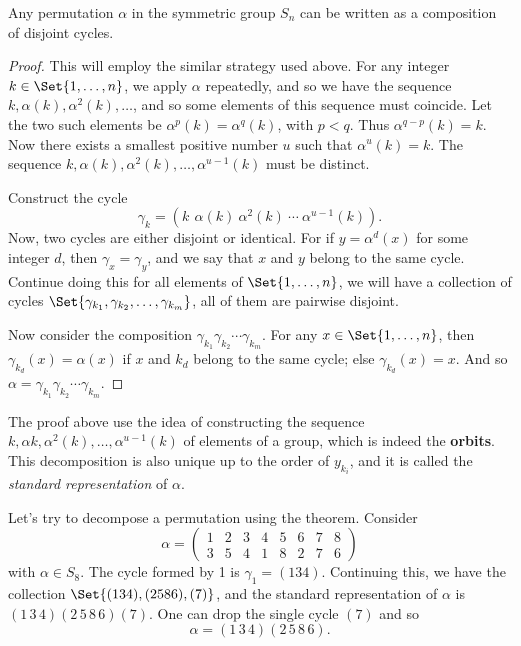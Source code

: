 \documentclass[main.tex]{subfiles}
\begin{document}
				\begin{theorem}
					Any permutation $\alpha$ in the symmetric group $S_n$ can be written as a composition of disjoint cycles.
				\end{theorem}
				\begin{proof}
					This will employ the similar strategy used above. For any integer $k \in \Set{1, \ldots, n}$, we apply $\alpha$ repeatedly, and so we have the sequence $k, \alpha (k), \alpha^2 (k), \ldots$, and so some elements of this sequence must coincide. Let the two such elements be $\alpha^p(k) = \alpha^q (k)$, with $p < q$. Thus $\alpha^{q - p}(k) = k$. Now there exists a smallest positive number $u$ such that $\alpha^u (k) = k$. The sequence  $k, \alpha (k), \alpha^2 (k), \ldots, \alpha^{u-1}(k)$ must be distinct. 
					
					Construct the cycle 
					\begin{equation*}
					\gamma_k = (k \:\, \alpha (k) \: \alpha^2 (k) \: \cdots \: \alpha^{u-1}(k)).
					\end{equation*} 
					Now, two cycles are either disjoint or identical. For if $y = \alpha^{d} (x)$ for some integer $d$, then $\gamma_x = \gamma_y$, and we say that $x$ and $y$ belong to the same cycle. Continue doing this for all elements of $\Set{1, \ldots, n}$, we will have a collection of cycles $\Set{\gamma_{k_1}, \gamma_{k_2}, \ldots, \gamma_{k_m}}$, all of them are pairwise disjoint.
					
					Now consider the composition $\gamma_{k_1}\gamma_{k_2}\cdots\gamma_{k_m}$. For any $x \in \Set{1, \ldots, n}$, then $\gamma_{k_d}(x) = \alpha(x)$ if $x$ and $k_d$ belong to the same cycle; else $\gamma_{k_d}(x) = x$. And so $\alpha = \gamma_{k_1}\gamma_{k_2}\cdots\gamma_{k_m}$.
				\end{proof}
				The proof above use the idea of constructing the sequence $k, \alpha k, \alpha^2 (k), \ldots ,\alpha^{u-1} (k)$ of elements of a group, which is indeed the \textbf{orbits}. This decomposition is also unique up to the order of $y_{k_i}$, and it is called the \textit{standard representation} of $\alpha$.
				
				Let's try to decompose a permutation using the theorem. Consider
				\begin{equation*}
				\alpha =
				\begin{pmatrix}
				1 & 2 & 3 & 4 & 5 & 6 & 7 & 8 \\
				3 & 5 & 4 & 1 & 8 & 2 & 7 & 6
				\end{pmatrix}
				\end{equation*}
				with $\alpha \in S_{8}$. The cycle formed by 1 is $\gamma_1 = (1 3 4)$. Continuing this, we have the collection $\Set{(1 3 4), (2 5 8 6), (7)}$, and the standard representation of $\alpha$ is $(1\,3\,4)(2\,5\, 8\,6)(7)$. One can drop the single cycle $(7)$ and so
				\begin{equation*}
					\alpha = (1\,3\,4)(2\,5\, 8\,6).
				\end{equation*}
				
\end{document}
